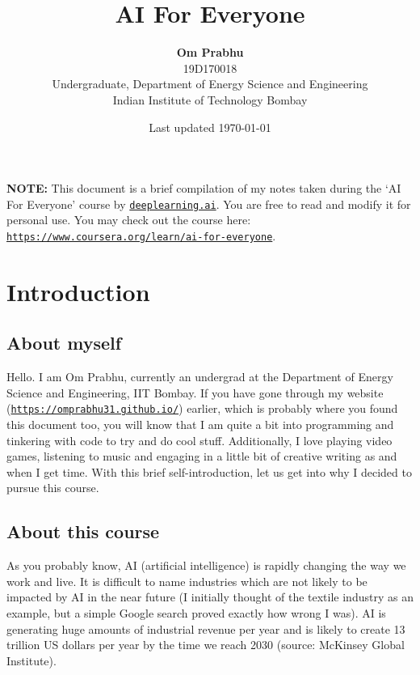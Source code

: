 \documentclass{article}[a4paper,12pt]
\title{\textbf{AI For Everyone}}
\author{
	\textbf{Om Prabhu}\\
	19D170018\\
	Undergraduate, Department of Energy Science and Engineering\\
	Indian Institute of Technology Bombay\\}
\date{Last updated \today}
\theoremstyle{definition}
\begin{document}
\maketitle
\vspace{-12pt}
\hrulefill
\vspace{6pt}

\textbf{NOTE:} This document is a brief compilation of my notes taken during the `AI For Everyone' course by \texttt{\href{https://www.deeplearning.ai/}{deeplearning.ai}}. You are free to read and modify it for personal use. You may check out the course here: \texttt{\href{https://www.coursera.org/learn/ai-for-everyone}{https://www.coursera.org/learn/ai-for-everyone}}.

\hrulefill
\tableofcontents
\vspace{6pt}

\hrulefill
\pagebreak

\section{Introduction}
\subsection{About myself}
Hello. I am Om Prabhu, currently an undergrad at the Department of Energy Science and Engineering, IIT Bombay. If you have gone through my website (\texttt{\href{https://omprabhu31.github.io/}{https://omprabhu31.github.io/}}) earlier, which is probably where you found this document too, you will know that I am quite a bit into programming and tinkering with code to try and do cool stuff. Additionally, I love playing video games, listening to music and engaging in a little bit of creative writing as and when I get time. With this brief self-introduction, let us get into why I decided to pursue this course.
\subsection{About this course}
As you probably know, AI (artificial intelligence) is rapidly changing the way we work and live. It is difficult to name industries which are not likely to be impacted by AI in the near future (I initially thought of the textile industry as an example, but a simple Google search proved exactly how wrong I was). AI is generating huge amounts of industrial revenue per year and is likely to create 13 trillion US dollars per year by the time we reach 2030 (source: McKinsey Global Institute).
\vspace{6pt}
\end{document}
